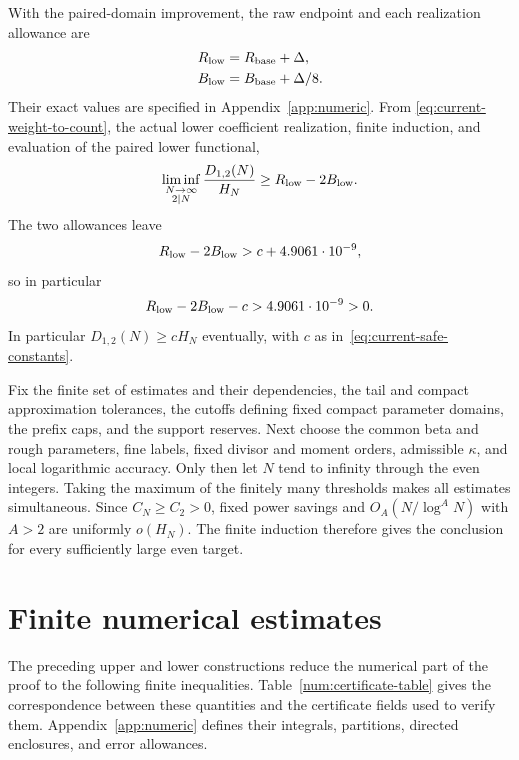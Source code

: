 With the paired-domain improvement, the raw endpoint and each
realization allowance are
\begin{align}
 R_{\rm low}&=R_{\rm base}+\Delta,\label{eq:current-R}\\
 B_{\rm low}&=B_{\rm base}+\Delta/8.\label{eq:current-B}
\end{align}
Their exact values are specified in Appendix~\ref{app:numeric}.
From \eqref{eq:current-weight-to-count}, the actual lower coefficient realization,
finite induction, and evaluation of the paired lower functional,
\begin{equation}
 \liminf_{\substack{N\to\infty\\2\mid N}}
         \frac{D_{1,2}(N)}{H_N}\ge R_{\rm low}-2B_{\rm low}.
 \label{eq:current-lower-derived}
\end{equation}
The two allowances leave
\begin{equation}
                  R_{\rm low}-2B_{\rm low}>c+4.9061\cdot10^{-9},
                  \label{eq:current-after-budgets}
\end{equation}
so in particular
\begin{equation}
                  R_{\rm low}-2B_{\rm low}-c>4.9061\cdot10^{-9}>0.
                  \label{eq:current-lower-slack}
\end{equation}
In particular $D_{1,2}(N)\ge cH_N$ eventually, with $c$ as in~\eqref{eq:current-safe-constants}.

Fix the finite set of estimates and their dependencies, the tail
and compact approximation tolerances, the cutoffs defining fixed compact
parameter domains, the prefix caps, and the support reserves. Next choose the common beta and rough
parameters, fine labels, fixed divisor and moment orders, admissible
$\kappa$, and local logarithmic accuracy. Only then let $N$ tend to
infinity through the even integers. Taking the maximum of the finitely
many thresholds makes all estimates simultaneous. Since $C_N\ge C_2>0$,
fixed power savings and $O_A(N/\log^AN)$ with $A>2$ are uniformly
$o(H_N)$. The finite induction therefore gives the conclusion for every
sufficiently large even target.

\section{Finite numerical estimates}
\label{sec:current-numeric}

The preceding upper and lower constructions reduce the numerical
part of the proof to the following finite inequalities.
Table~\ref{num:certificate-table} gives the correspondence between
these quantities and the certificate fields used to verify them.
Appendix~\ref{app:numeric} defines their integrals, partitions,
directed enclosures, and error allowances.

